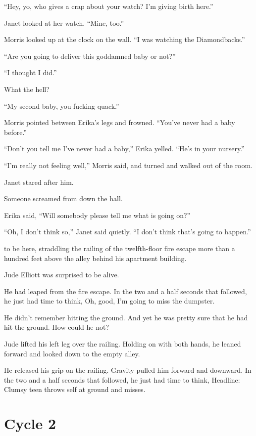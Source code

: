 “Hey, yo, who gives a crap about your watch? I’m giving birth here.”

Janet looked at her watch. “Mine, too.”

Morris looked up at the clock on the wall. “I was watching the Diamondbacks.”

“Are you going to deliver this goddamned baby or not?”

“I thought I did.”

What the hell?

“My second baby, you fucking quack.”

Morris pointed between Erika’s legs and frowned. “You’ve never had a baby before.”

“Don’t you tell me I’ve never had a baby,” Erika yelled. “He’s in your nursery.”

“I’m really not feeling well,” Morris said, and turned and walked out of the room.

Janet stared after him.

Someone screamed from down the hall.

Erika said, “Will somebody please tell me what is going on?”

“Oh, I don’t think so,” Janet said quietly. “I don’t think that’s going to happen.”




 to be here, straddling the railing of the twelfth-floor fire escape more than a hundred feet above the alley behind his apartment building.

Jude Elliott was surprised to be alive.

He had leaped from the fire escape. In the two and a half seconds that followed, he just had time to think, Oh, good, I’m going to miss the dumpster.

He didn’t remember hitting the ground. And yet he was pretty sure that he had hit the ground. How could he not?

Jude lifted his left leg over the railing. Holding on with both hands, he leaned forward and looked down to the empty alley.

He released his grip on the railing. Gravity pulled him forward and downward. In the two and a half seconds that followed, he just had time to think, Headline: Clumsy teen throws self at ground and misses.

\chapter{Cycle 2}

